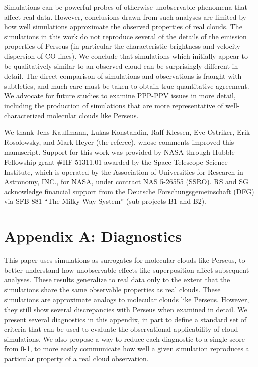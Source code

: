 Simulations can be powerful probes of otherwise-unobservable phenomena that affect real data. However, conclusions drawn from such analyses are
limited by how well simulations approximate the observed properties of real clouds. The simulations in this work do not reproduce several of the details of the emission properties of Perseus (in particular the characteristic brightness and velocity dispersion of CO lines). We conclude that simulations which initially appear to be qualitatively similar to an observed cloud can be surprisingly different in detail. The direct comparison of simulations and observations is fraught with subtleties, and much care must be taken to obtain true quantitative agreement. We advocate for future studies to examine PPP-PPV issues in more detail, including the production of simulations that are more representative of well-characterized molecular clouds like Perseus.

We thank  Jens Kauffmann, Lukas Konstandin, Ralf Klessen, Eve Ostriker,  Erik Rosolowsky, and Mark Heyer (the referee), whose comments improved this manuscript. Support for this work was provided by NASA through Hubble Fellowship grant \#HF-51311.01 awarded by the Space Telescope Science Institute, which is operated by the Association of Universities for Research in Astronomy, INC., for NASA, under contract NAS 5-26555 (SSRO). RS and SG acknowledge financial support from the Deutsche Forschungsgemeinschaft (DFG) via SFB 881 ``The Milky Way System'' (sub-projects B1 and B2).


\section{Appendix A: Diagnostics}
\label{sec:diagnostics}

This paper uses simulations as surrogates for molecular clouds like
Perseus, to better understand how unobservable effects like
superposition affect subsequent analyses. These results generalize to
real data only to the extent that the simulations share the same
observable properties as real clouds. These simulations are approximate analogs to molecular clouds like Perseus.
However, they still show several discrepancies with Perseus when examined in
detail. We present several diagnostics in this appendix, in part to define
a standard set of criteria that can be used to evaluate the
observational applicability of cloud simulations. We also
propose a way to reduce each diagnostic to a single score from 0-1, to
more easily communicate how well a given simulation reproduces a particular
property of a real cloud observation.


